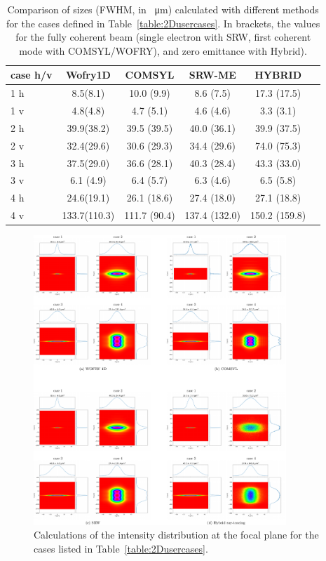 \documentclass{iucr}              %
\begin{document}
\begin{table}[]
    \label{table:comparison}
    \caption{Comparison of sizes (FWHM, in \SI{}{\micro\meter}) calculated with different methods for the cases defined in Table~\ref{table:2Dusercases}.
    In brackets, the values for the fully coherent beam (single electron with SRW, first coherent mode with COMSYL/WOFRY), and zero emittance with Hybrid). 
    }
    \centering
    \begin{tabular}{p{}|c|c|c|c|c}
         case h/v &
         Wofry1D&
         COMSYL&
         SRW-ME&
         HYBRID \\
         \hline
1 h  & 8.5(8.1)    & 10.0 (9.9)  & 8.6 (7.5)   & 17.3 (17.5) \\
1 v  & 4.8(4.8)    & 4.7 (5.1)   & 4.6 (4.6)   & 3.3 (3.1) \\
\hline
2 h  & 39.9(38.2)  & 39.5 (39.5) & 40.0 (36.1)  & 39.9 (37.5) \\
2 v  & 32.4(29.6)  & 30.6 (29.3) & 34.4 (29.6)  & 74.0 (75.3) \\
\hline
3 h  & 37.5(29.0)  & 36.6 (28.1) & 40.3 (28.4)  & 43.3 (33.0) \\
3 v  & 6.1 (4.9)   & 6.4 (5.7)   & 6.3 (4.6)    & 6.5 (5.8) \\
\hline
4 h  & 24.6(19.1)  & 26.1 (18.6)  & 27.4 (18.0)   & 27.1 (18.8) \\
4 v  & 133.7(110.3)& 111.7 (90.4) & 137.4 (132.0) & 150.2 (159.8) \\
    \end{tabular}
\end{table}



\newpage
\onecolumn

\begin{figure}
    \label{fig:sim_results}
    \includegraphics[width=0.85\textwidth]{figures/fig_sim_results.pdf}
    \caption{Calculations of the intensity distribution at the focal plane for the cases listed in Table~\ref{table:2Dusercases}.}
\end{figure}
\end{document}
